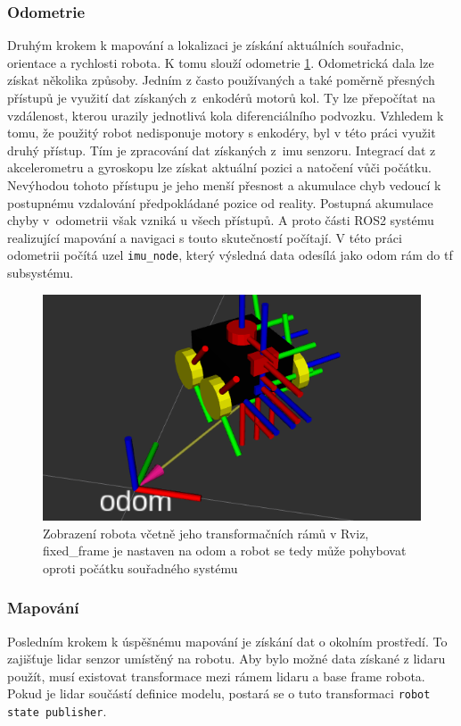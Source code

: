 \subsubsection*{Odometrie}
Druhým krokem k mapování a lokalizaci je získání aktuálních souřadnic, orientace a rychlosti robota. K tomu slouží odometrie \ref{fig:rviz_odom}. Odometrická dala lze získat několika způsoby. Jedním z často používaných a také poměrně přesných přístupů je využití dat získaných z~enkodérů motorů kol. Ty lze přepočítat na vzdálenost, kterou urazily jednotlivá kola diferenciálního podvozku. \cite[str:~171-172]{mobilní_roboty} Vzhledem k tomu, že použitý robot nedisponuje motory s enkodéry, byl v této práci využit druhý přístup. Tím je zpracování dat získaných z~imu senzoru. Integrací dat z akcelerometru a gyroskopu lze získat aktuální pozici a natočení vůči počátku. Nevýhodou tohoto přístupu je jeho menší přesnost a akumulace chyb vedoucí k postupnému vzdalování předpokládané pozice od reality. Postupná akumulace chyby v~odometrii však vzniká u všech přístupů. A proto části ROS2 systému realizující mapování a navigaci s touto skutečností počítají. V této práci odometrii počítá uzel \verb|imu_node|, který výsledná data odesílá jako odom rám do tf subsystému. 

\begin{figure}[h!]
	\centering
	\includegraphics[scale=0.6]{obrazky-figures/odom.png}
	\caption[Zobrazení transformací a odometrie v nástroji Rviz]{Zobrazení robota včetně jeho transformačních rámů v Rviz, fixed\_frame je nastaven na odom a robot se tedy může pohybovat oproti počátku souřadného systému}
	\label{fig:rviz_odom}
\end{figure}

\subsubsection*{Mapování}
Posledním krokem k úspěšnému mapování je získání dat o okolním prostředí. To zajišťuje lidar senzor umístěný na robotu. Aby bylo možné data získané z lidaru použít, musí existovat transformace mezi rámem lidaru a base frame robota. Pokud je lidar součástí definice modelu, postará se o tuto transformaci \verb|robot state publisher|.

